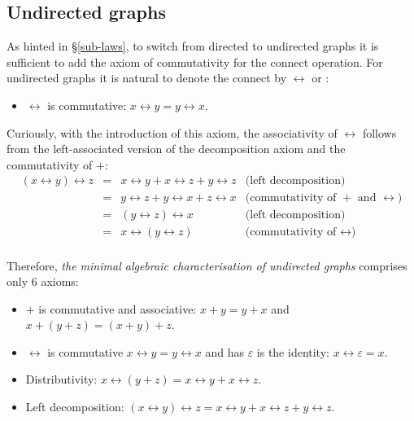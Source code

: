 \subsection{Undirected graphs}\label{sub-undirected}

As hinted in \S\ref{sub-laws}, to switch from directed to undirected graphs it
is sufficient to add the axiom of commutativity for the connect operation. For
undirected graphs it is natural to denote the connect by $\leftrightarrow$ or
\textemdash:

\begin{itemize}
    \item $\leftrightarrow$ is commutative: $x \leftrightarrow y = y \leftrightarrow x$.
\end{itemize}

Curiously, with the introduction of this axiom, the associativity of $\leftrightarrow$
follows from the left-associated version of the decomposition axiom and the
commutativity of $+$:
\[
\begin{array}{rcll}
(x \leftrightarrow y) \leftrightarrow z & = & x \leftrightarrow y + x \leftrightarrow z + y \leftrightarrow z & \text{(left decomposition)}\\
 & = & y \leftrightarrow z + y \leftrightarrow x + z \leftrightarrow x & \text{(commutativity of $+$ and $\leftrightarrow$)}\\
 & = &  (y \leftrightarrow z) \leftrightarrow x & \text{(left decomposition)}\\
 & = &   x \leftrightarrow (y \leftrightarrow z) & \text{(commutativity of $\leftrightarrow$)}\\
\end{array}
\]

Therefore, \emph{the minimal algebraic characterisation of undirected graphs}
comprises only 6 axioms:

\begin{itemize}
    \item $+$ is commutative and associative: $x + y = y + x$ and
    $x + (y + z) = (x + y) + z$.
    \item $\leftrightarrow$ is commutative $x \leftrightarrow y = y \leftrightarrow x$ and
    has $\varepsilon$ is the identity: $x \leftrightarrow \varepsilon = x$.
    \item Distributivity:
    $x \leftrightarrow (y + z) = x \leftrightarrow y + x \leftrightarrow z$.
    \item Left decomposition: $(x \leftrightarrow y) \leftrightarrow z =
    x \leftrightarrow y + x \leftrightarrow z + y \leftrightarrow z$.
\end{itemize}

